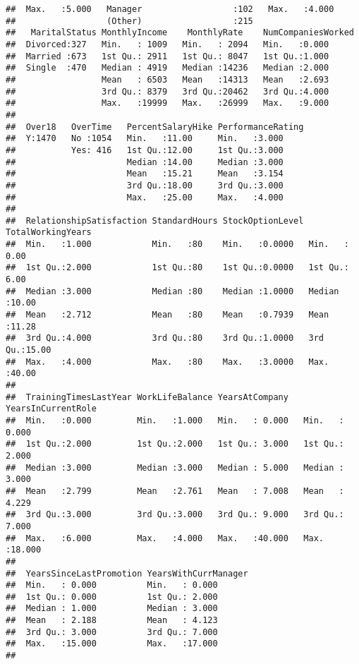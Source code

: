 \documentclass[]{article}
\begin{document}
\begin{verbatim}
##  Max.   :5.000   Manager                  :102   Max.   :4.000  
##                  (Other)                  :215                  
##   MaritalStatus MonthlyIncome    MonthlyRate    NumCompaniesWorked
##  Divorced:327   Min.   : 1009   Min.   : 2094   Min.   :0.000     
##  Married :673   1st Qu.: 2911   1st Qu.: 8047   1st Qu.:1.000     
##  Single  :470   Median : 4919   Median :14236   Median :2.000     
##                 Mean   : 6503   Mean   :14313   Mean   :2.693     
##                 3rd Qu.: 8379   3rd Qu.:20462   3rd Qu.:4.000     
##                 Max.   :19999   Max.   :26999   Max.   :9.000     
##                                                                   
##  Over18   OverTime   PercentSalaryHike PerformanceRating
##  Y:1470   No :1054   Min.   :11.00     Min.   :3.000    
##           Yes: 416   1st Qu.:12.00     1st Qu.:3.000    
##                      Median :14.00     Median :3.000    
##                      Mean   :15.21     Mean   :3.154    
##                      3rd Qu.:18.00     3rd Qu.:3.000    
##                      Max.   :25.00     Max.   :4.000    
##                                                         
##  RelationshipSatisfaction StandardHours StockOptionLevel TotalWorkingYears
##  Min.   :1.000            Min.   :80    Min.   :0.0000   Min.   : 0.00    
##  1st Qu.:2.000            1st Qu.:80    1st Qu.:0.0000   1st Qu.: 6.00    
##  Median :3.000            Median :80    Median :1.0000   Median :10.00    
##  Mean   :2.712            Mean   :80    Mean   :0.7939   Mean   :11.28    
##  3rd Qu.:4.000            3rd Qu.:80    3rd Qu.:1.0000   3rd Qu.:15.00    
##  Max.   :4.000            Max.   :80    Max.   :3.0000   Max.   :40.00    
##                                                                           
##  TrainingTimesLastYear WorkLifeBalance YearsAtCompany   YearsInCurrentRole
##  Min.   :0.000         Min.   :1.000   Min.   : 0.000   Min.   : 0.000    
##  1st Qu.:2.000         1st Qu.:2.000   1st Qu.: 3.000   1st Qu.: 2.000    
##  Median :3.000         Median :3.000   Median : 5.000   Median : 3.000    
##  Mean   :2.799         Mean   :2.761   Mean   : 7.008   Mean   : 4.229    
##  3rd Qu.:3.000         3rd Qu.:3.000   3rd Qu.: 9.000   3rd Qu.: 7.000    
##  Max.   :6.000         Max.   :4.000   Max.   :40.000   Max.   :18.000    
##                                                                           
##  YearsSinceLastPromotion YearsWithCurrManager
##  Min.   : 0.000          Min.   : 0.000      
##  1st Qu.: 0.000          1st Qu.: 2.000      
##  Median : 1.000          Median : 3.000      
##  Mean   : 2.188          Mean   : 4.123      
##  3rd Qu.: 3.000          3rd Qu.: 7.000      
##  Max.   :15.000          Max.   :17.000      
## 
\end{verbatim}
\end{document}
